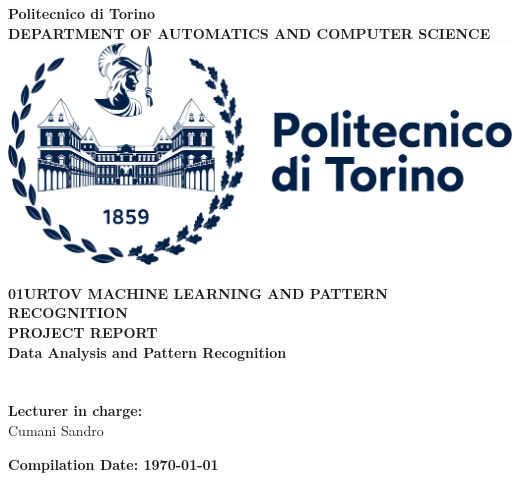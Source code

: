 \documentclass[a4paper, 12pt, english]{article}
\begin{document}
    \begin{titlepage}
        \begin{center}
            \textbf{\LARGE Politecnico di Torino}\\[0.5cm]
            \textbf{\large DEPARTMENT OF AUTOMATICS AND COMPUTER SCIENCE}\\[0.2cm]
            \vspace{20pt}
            \includegraphics[scale=0.5]{img/title/logo-polito}\\[0.5cm]

            \par
            \vspace{20pt}
            \textbf{\Large 01URTOV MACHINE LEARNING AND PATTERN RECOGNITION}\\
            \vspace{30pt}
            \myrule[1pt][7pt]
            \textbf{\LARGE  PROJECT REPORT}\\
            \vspace{15pt}
            \textbf{\large Data Analysis and Pattern Recognition}\\
            \myrule[1pt][7pt]
            \vspace{25pt}
            \hspace{25pt}\\
            \hspace{20pt}\\

            \vspace{55pt}
            \textbf {\large Lecturer in charge:}\\[0.2cm]
            \Large {Cumani Sandro}\\[0.1cm]
        \end{center}

        \par
        \vfill
        \begin{center}
            \textbf{Compilation Date: \today}\\
        \end{center}

    \end{titlepage}
\end{document}
